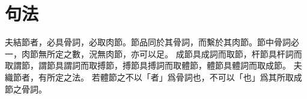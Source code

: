 \chapter*{句法}
夫結節者，必具骨詞，必取肉節。節品同於其骨詞，而繫於其肉節。節中骨詞必一，肉節無所定之數，況無肉節，亦可以足。
成節具成詞而取節，杆節具杆詞而取謂節，謂節具謂詞而取搏節，搏節具搏詞而取體節，體節具體詞而取成節。
夫織節者，有所定之法。
若體節之不以「者」爲骨詞也，不可以「也」爲其所取成節之骨詞。
